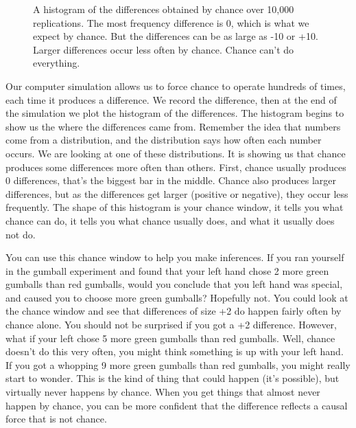 \documentclass[
  letterpaper,
  DIV=11,
  numbers=noendperiod]{scrreprt}
\begin{document}
\begin{figure}


\caption{\label{fig-5histdiffgumball}A histogram of the differences
obtained by chance over 10,000 replications. The most frequency
difference is 0, which is what we expect by chance. But the differences
can be as large as -10 or +10. Larger differences occur less often by
chance. Chance can't do everything.}

\end{figure}%

Our computer simulation allows us to force chance to operate hundreds of
times, each time it produces a difference. We record the difference,
then at the end of the simulation we plot the histogram of the
differences. The histogram begins to show us the where the differences
came from. Remember the idea that numbers come from a distribution, and
the distribution says how often each number occurs. We are looking at
one of these distributions. It is showing us that chance produces some
differences more often than others. First, chance usually produces 0
differences, that's the biggest bar in the middle. Chance also produces
larger differences, but as the differences get larger (positive or
negative), they occur less frequently. The shape of this histogram is
your chance window, it tells you what chance can do, it tells you what
chance usually does, and what it usually does not do.

You can use this chance window to help you make inferences. If you ran
yourself in the gumball experiment and found that your left hand chose 2
more green gumballs than red gumballs, would you conclude that you left
hand was special, and caused you to choose more green gumballs?
Hopefully not. You could look at the chance window and see that
differences of size +2 do happen fairly often by chance alone. You
should not be surprised if you got a +2 difference. However, what if
your left chose 5 more green gumballs than red gumballs. Well, chance
doesn't do this very often, you might think something is up with your
left hand. If you got a whopping 9 more green gumballs than red
gumballs, you might really start to wonder. This is the kind of thing
that could happen (it's possible), but virtually never happens by
chance. When you get things that almost never happen by chance, you can
be more confident that the difference reflects a causal force that is
not chance.
\end{document}
